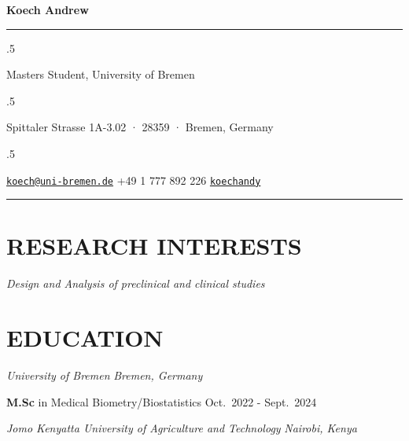 \documentclass[13pt,]{article}
\providecommand{\tightlist}{%
  \setlength{\itemsep}{0pt}\setlength{\parskip}{0pt}}
\renewenvironment{itemize}{
  \begin{list}{}{
    \setlength{\leftmargin}{1.5em}
  }
}{
  \end{list}
}
\begin{document}
\centerline{\huge \bf Koech Andrew}

\vspace{2 mm}

\hrule

\vspace{2 mm}

\moveleft.5\hoffset\centerline{Masters Student, University of Bremen}
\moveleft.5\hoffset\centerline{Spittaler Strasse 1A-3.02 · 28359 ·
Bremen, Germany}
\moveleft.5\hoffset\centerline{ \faEnvelopeO \hspace{1 mm} \href{mailto:}{\tt \href{mailto:koech@uni-bremen.de}{\nolinkurl{koech@uni-bremen.de}}} \hspace{1 mm}  \faPhone \hspace{1 mm}  +49
1 777 892
226  \hspace{1 mm}  \faGithub \hspace{1 mm} \href{http://github.com/koechandy}{\tt koechandy} \hspace{1 mm}      } 

\vspace{2 mm}

\hrule


\hypertarget{research-interests}{%
\section{\texorpdfstring{\textbf{RESEARCH
INTERESTS}}{RESEARCH INTERESTS}}\label{research-interests}}

\begin{itemize}
\tightlist
\item
  \emph{Design and Analysis of preclinical and clinical studies}
\end{itemize}

\hypertarget{education}{%
\section{\texorpdfstring{\textbf{EDUCATION}}{EDUCATION}}\label{education}}

\emph{University of Bremen} \hfill \emph{Bremen, Germany}

\begin{itemize}
\tightlist
\item
  \textbf{M.Sc} in Medical Biometry/Biostatistics \hfill Oct.~2022 -
  Sept.~2024
\end{itemize}

\emph{Jomo Kenyatta University of Agriculture and Technology}
\hfill \emph{Nairobi, Kenya}
\end{document}
